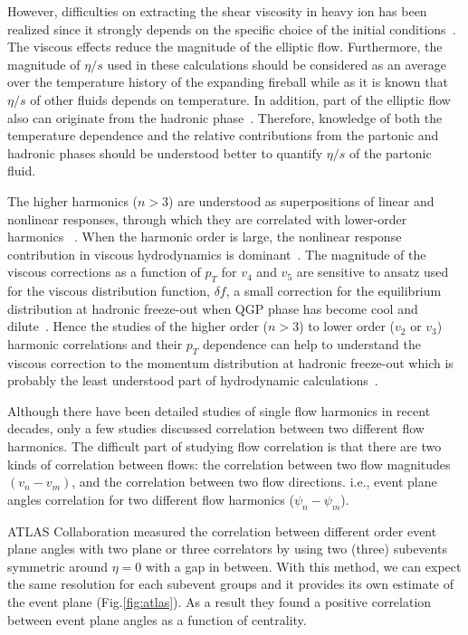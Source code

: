 However, difficulties on extracting the shear viscosity in heavy ion has been realized since it strongly depends on the specific choice of the initial conditions~\cite{Romatschke:2007mq,Luzum:2012wu,Shen:2011zc}.
The viscous effects reduce the magnitude of the elliptic flow. Furthermore, the magnitude of $\eta/s$ used in these calculations should be considered as an average over the temperature history of the expanding fireball while as it is known that $\eta/s$ of other fluids depends on temperature. 
In addition, part of the elliptic flow also can originate from the hadronic phase~\cite{Bozek:2011ua,Rose:2014fba,Ryu:2015vwa}. Therefore,
knowledge of both the temperature dependence and the relative contributions from the partonic and hadronic phases should be understood better to quantify $\eta/s$ of the partonic fluid.

The higher harmonics ($n>3$) are understood as superpositions of linear and nonlinear responses, through which they are correlated with lower-order harmonics ~\cite{Teaney:2012ke,Bravina:2013ora}. When the harmonic order is large, the nonlinear response contribution in viscous hydrodynamics is dominant~\cite{Teaney:2012ke,Bravina:2013ora}.
The magnitude of the viscous corrections as a function of $p_T$ for $v_4$ and $v_5$ are sensitive to ansatz used for the viscous distribution function, $\delta f$, a small correction for the equilibrium distribution at hadronic freeze-out when QGP phase has become cool and dilute~\cite{Luzum:2010ad}.
Hence the studies of the higher order ($n>3$) to lower order ($v_2$ or $v_3$) harmonic correlations and their $p_T$ dependence can help to understand the viscous correction to the momentum distribution at hadronic freeze-out which is probably the least understood part of hydrodynamic calculations~\cite{Teaney:2012ke,Niemi:2015qia}.


 Although there have been detailed studies of single flow harmonics in recent decades, only a few studies discussed correlation between two different flow harmonics. The difficult part of studying flow correlation is that there are two kinds of correlation between flows: the correlation between two flow magnitudes $(v_n - v_m)$, and the correlation between two flow directions. i.e., event plane angles correlation for two different flow harmonics ($\psi_n - \psi_m$).
 
 ATLAS Collaboration measured the correlation between different order event plane angles with two plane or three correlators by using two (three) subevents symmetric around $\eta = 0$ with a gap in between. With this method, we can expect the same resolution for each subevent groups and it provides its own estimate of the event plane (Fig.\ref{fig:atlas}). As a result they found a positive correlation between event plane angles as a function of centrality.
 
